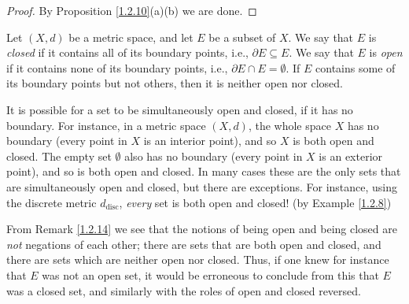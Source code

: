 \begin{proof}
    By Proposition \ref{1.2.10}(a)(b) we are done.
\end{proof}

\begin{definition}\label{1.2.12}
    Let \((X, d)\) be a metric space, and let \(E\) be a subset of \(X\).
    We say that \(E\) is \emph{closed} if it contains all of its boundary points, i.e., \(\partial E \subseteq E\).
    We say that \(E\) is \emph{open} if it contains none of its boundary points, i.e., \(\partial E \cap E = \emptyset\).
    If \(E\) contains some of its boundary points but not others, then it is neither open nor closed.
\end{definition}

\setcounter{theorem}{13}
\begin{remark}\label{1.2.14}
    It is possible for a set to be simultaneously open and closed, if it has no boundary.
    For instance, in a metric space \((X, d)\), the whole space \(X\) has no boundary (every point in \(X\) is an interior point), and so \(X\) is both open and closed.
    The empty set \(\emptyset\) also has no boundary (every point in \(X\) is an exterior point), and so is both open and closed.
    In many cases these are the only sets that are simultaneously open and closed, but there are exceptions.
    For instance, using the discrete metric \(d_{\text{disc}}\), \emph{every} set is both open and closed! (by Example \ref{1.2.8})
\end{remark}

\begin{note}
    From Remark \ref{1.2.14} we see that the notions of being open and being closed are \emph{not} negations of each other;
    there are sets that are both open and closed, and there are sets which are neither open nor closed.
    Thus, if one knew for instance that \(E\) was not an open set, it would be erroneous to conclude from this that \(E\) was a closed set, and similarly with the roles of open and closed reversed.
\end{note}

